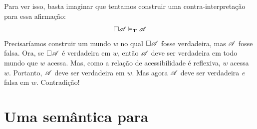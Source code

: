 Para ver isso, basta imaginar que tentamos construir uma contra-interpretação para essa afirmação:
\[
	\Box \mathscr{A}\vDash_{\mathbf{T}} \mathscr{A}
\]
Precisaríamos construir um mundo $w$ no qual $\Box \mathscr{A}$ fosse verdadeira, mas $\mathscr{A}$ fosse falsa. Ora, se $\Box \mathscr{A}$ é verdadeira em $w$, então $\mathscr{A}$ deve ser verdadeira em todo mundo que $w$ acessa. Mas, como a relação de acessibilidade é reflexiva, $w$ acessa $w$. Portanto, $\mathscr{A}$ deve ser verdadeira em $w$. Mas agora $\mathscr{A}$ deve ser verdadeira \emph{e} falsa em $w$. Contradição!

\section{Uma semântica para \mlSfour}
\label{SemanticsS4}

